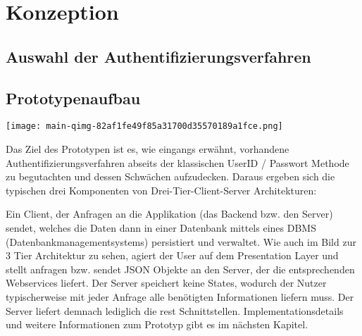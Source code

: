 \chapter{Konzeption}
\section{Auswahl der Authentifizierungsverfahren}
\section{Prototypenaufbau}

\begin{center}
    \center
    \texttt{[image: main-qimg-82af1fe49f85a31700d35570189a1fce.png]}
\end{center} 

Das Ziel des Prototypen ist es, wie eingangs erwähnt, vorhandene Authentifizierungsverfahren abseits der klassischen UserID / Passwort Methode zu begutachten und dessen Schwächen aufzudecken. Daraus ergeben sich die typischen drei Komponenten von Drei-Tier-Client-Server Architekturen:

Ein Client, der Anfragen an die Applikation (das Backend bzw. den Server) sendet, welches die Daten dann in einer Datenbank mittels eines DBMS (Datenbankmanagementsystems) persistiert und verwaltet. Wie auch im Bild zur 3 Tier Architektur zu sehen, agiert der User auf dem Presentation Layer und stellt anfragen bzw. sendet JSON Objekte an den Server, der die entsprechenden Webservices liefert. Der Server speichert keine States, wodurch der Nutzer typischerweise mit jeder Anfrage alle benötigten Informationen liefern muss. Der Server liefert demnach lediglich die \ac{rest} Schnittstellen. Implementationsdetails und weitere Informationen zum Prototyp gibt es im nächsten Kapitel.
